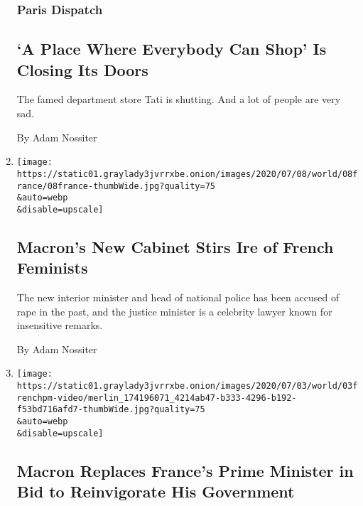 \begin{enumerate}
  \hypertarget{paris-dispatch}{%
  \subsubsection{Paris Dispatch}\label{paris-dispatch}}

  \hypertarget{a-place-where-everybody-can-shop-is-closing-its-doors}{%
  \subsection{`A Place Where Everybody Can Shop' Is Closing Its
  Doors}\label{a-place-where-everybody-can-shop-is-closing-its-doors}}

  The famed department store Tati is shutting. And a lot of people are
  very sad.

  By Adam Nossiter
\item
  \href{/2020/07/08/world/europe/macron-cabinet-feminists-Darmanin.html}{}

  \texttt{[image: https://static01.graylady3jvrrxbe.onion/images/2020/07/08/world/08france/08france-thumbWide.jpg?quality=75\\\&auto=webp\\\&disable=upscale]}

  \hypertarget{macrons-new-cabinet-stirs-ire-of-french-feminists}{%
  \subsection{Macron's New Cabinet Stirs Ire of French
  Feminists}\label{macrons-new-cabinet-stirs-ire-of-french-feminists}}

  The new interior minister and head of national police has been accused
  of rape in the past, and the justice minister is a celebrity lawyer
  known for insensitive remarks.

  By Adam Nossiter
\item
  \href{/2020/07/03/world/europe/france-prime-minister-resign.html}{}

  \texttt{[image: https://static01.graylady3jvrrxbe.onion/images/2020/07/03/world/03frenchpm-video/merlin\_174196071\_4214ab47-b333-4296-b192-f53bd716afd7-thumbWide.jpg?quality=75\\\&auto=webp\\\&disable=upscale]}

  \hypertarget{macron-replaces-frances-prime-minister-in-bid-to-reinvigorate-his-government}{%
  \subsection{Macron Replaces France's Prime Minister in Bid to
  Reinvigorate His
  Government}\label{macron-replaces-frances-prime-minister-in-bid-to-reinvigorate-his-government}}


\end{enumerate}
